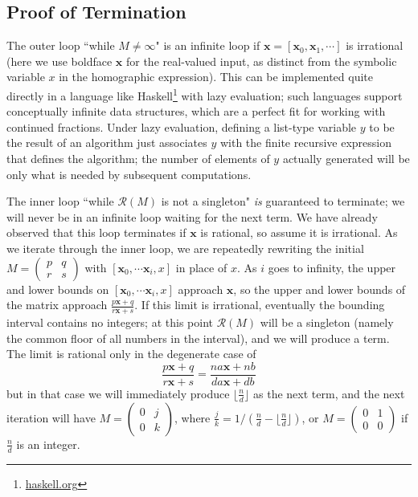 \documentclass[11pt, oneside]{amsart}   	%
\newcommand{\pqrs}{\left(
\begin{smallmatrix} 
p & q\\ 
r & s 
\end{smallmatrix}
\right)}
\renewcommand{\:}{\negthickspace:\negthickspace}
\begin{document}
\subsection{Proof of Termination}
The outer loop ``while $M \neq \infty$" is an infinite loop if $\mathbf{x} = [\mathbf{x}_0, \mathbf{x}_1,\cdots]$ is irrational
(here we use boldface $\mathbf{x}$ for the real-valued input, as distinct from the symbolic variable $x$ in the homographic
expression). This can be implemented quite directly in a language like Haskell\footnote{\href{https://haskell.org}{haskell.org}} with
lazy evaluation\cite{hutton2007programming}; such languages support conceptually infinite data structures, which are a perfect fit for working with continued
fractions. Under lazy evaluation, defining a list-type variable $y$ to be the result of an algorithm just associates $y$ with the finite recursive
expression that defines the algorithm; the number of elements of $y$ actually generated will be only what is needed by subsequent computations.

The inner loop ``while $\mathcal{R}(M)$ is not a singleton" \emph{is} guaranteed to terminate; we will never be in an infinite loop
waiting for the next term. We have already observed that this loop terminates if $\mathbf{x}$ is rational, so assume it is irrational. As
we iterate through the inner loop, we are repeatedly rewriting the initial $M = \pqrs$
with $[\mathbf{x}_0, \cdots \mathbf{x}_i, x]$ in place of $x$. As $i$ goes to infinity, the upper and lower bounds on
$[\mathbf{x}_0, \cdots \mathbf{x}_i, x]$ approach $\mathbf{x}$, so the upper and lower bounds of the matrix approach
$\frac{p\mathbf{x}+q}{r\mathbf{x}+s}$.
If this limit is irrational, eventually the bounding interval contains no integers; at this point $\mathcal{R}(M)$  will be a singleton
(namely the common floor of all numbers in the interval), and we will produce a term. The limit is rational only in the degenerate case
of
\[
\frac{p\mathbf{x}+q}{r\mathbf{x}+s} = \frac{na\mathbf{x}+nb}{da\mathbf{x}+db}
\]
but in that case we will immediately produce $\lfloor \frac{n}{d} \rfloor$ as the next term,
and the next iteration will have $M =\left(
\begin{smallmatrix} 
0 & j\\ 
0 & k 
\end{smallmatrix}
\right)$, where $\frac{j}{k} = 1/(\frac{n}{d}  -\lfloor \frac{n}{d} \rfloor)$, or $M = \left(\begin{smallmatrix}0 & 1 \\ 0 & 0\end{smallmatrix}\right)$ if $\frac{n}{d}$ is an integer.
\end{document}
